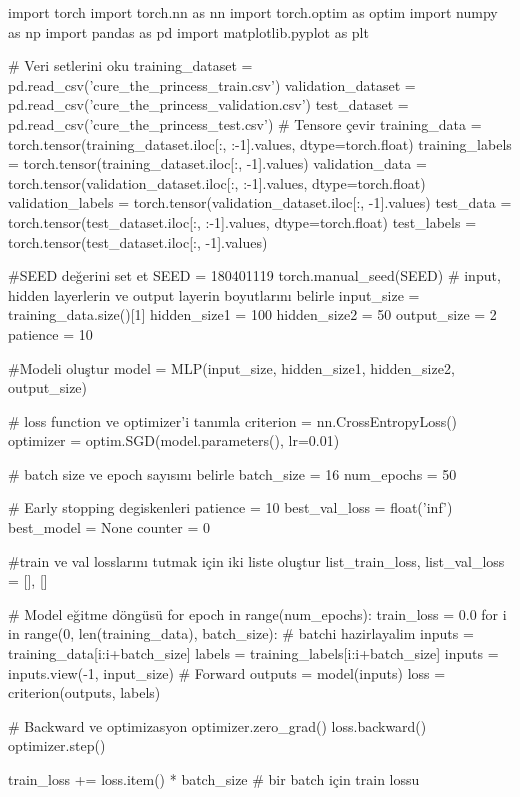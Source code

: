 \documentclass[11pt]{article}
\begin{document}
\begin{python}
import torch
import torch.nn as nn
import torch.optim as optim
import numpy as np
import pandas as pd
import matplotlib.pyplot as plt


# Veri setlerini oku
training_dataset = pd.read_csv('cure_the_princess_train.csv')
validation_dataset = pd.read_csv('cure_the_princess_validation.csv')
test_dataset = pd.read_csv('cure_the_princess_test.csv')
# Tensore çevir
training_data = torch.tensor(training_dataset.iloc[:, :-1].values, dtype=torch.float)
training_labels = torch.tensor(training_dataset.iloc[:, -1].values)
validation_data = torch.tensor(validation_dataset.iloc[:, :-1].values, dtype=torch.float)
validation_labels = torch.tensor(validation_dataset.iloc[:, -1].values)
test_data = torch.tensor(test_dataset.iloc[:, :-1].values, dtype=torch.float)
test_labels = torch.tensor(test_dataset.iloc[:, -1].values)

#SEED değerini set et
SEED = 180401119
torch.manual_seed(SEED)
# input, hidden layerlerin ve output layerin boyutlarını belirle
input_size = training_data.size()[1] 
hidden_size1 = 100
hidden_size2 = 50
output_size = 2 
patience = 10

#Modeli oluştur
model = MLP(input_size, hidden_size1, hidden_size2, output_size)

# loss function ve optimizer'i tanımla
criterion = nn.CrossEntropyLoss()
optimizer = optim.SGD(model.parameters(), lr=0.01)

# batch size ve epoch sayısını belirle
batch_size = 16
num_epochs = 50

# Early stopping degiskenleri
patience = 10
best_val_loss = float('inf')
best_model = None
counter = 0

#train ve val losslarını tutmak için iki liste oluştur
list_train_loss, list_val_loss = [], []

# Model eğitme döngüsü
for epoch in range(num_epochs):
    train_loss = 0.0
    for i in range(0, len(training_data), batch_size):
        # batchi hazirlayalim
        inputs = training_data[i:i+batch_size]
        labels = training_labels[i:i+batch_size]
        inputs = inputs.view(-1, input_size)
        # Forward 
        outputs = model(inputs)
        loss = criterion(outputs, labels)
        
        # Backward ve optimizasyon
        optimizer.zero_grad()
        loss.backward()
        optimizer.step()
        
        train_loss += loss.item() * batch_size # bir batch için train lossu
        

\end{python}
\end{document}
